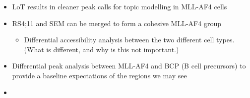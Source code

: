     \begin{itemize}
    \tightlist
    \item
      LoT results in cleaner peak calls for topic modelling in MLL-AF4 cells
    \item
      RS4;11 and SEM can be merged to form a cohesive MLL-AF4 group
    
      \begin{itemize}
      \tightlist
      \item
        Differential accessibility analysis between the two different cell
        types. (What is different, and why is this not important.)
      \end{itemize}
    \item
      Differential peak analysis between MLL-AF4 and BCP (B cell precursors)
      to provide a baseline expectations of the regions we may see
    \item
    \end{itemize}